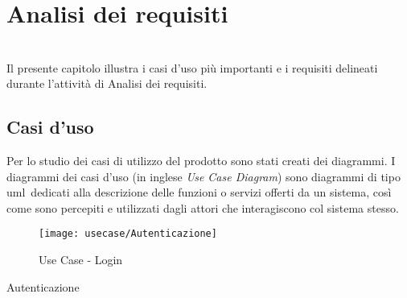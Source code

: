 
\chapter{Analisi dei requisiti}
\label{cap:analisi-requisiti}

\\
Il presente capitolo illustra i casi d'uso più importanti e i requisiti delineati durante l'attività di Analisi dei requisiti.

\section{Casi d'uso}
Per lo studio dei casi di utilizzo del prodotto sono stati creati dei diagrammi. I diagrammi dei casi d'uso (in inglese \emph{Use Case Diagram}) sono diagrammi di tipo \gls{uml}\glsfirstoccur\  dedicati alla descrizione delle funzioni o servizi offerti da un sistema, così come sono percepiti e utilizzati dagli attori che interagiscono col sistema stesso.



\begin{figure}[!ht] 
    \centering 
    \texttt{[image: usecase/Autenticazione]} 
    \caption{Use Case - Login}
\end{figure}

\begin{usecase}{1}{Autenticazione}
\label{uc:autenticazione}
\end{usecase}


